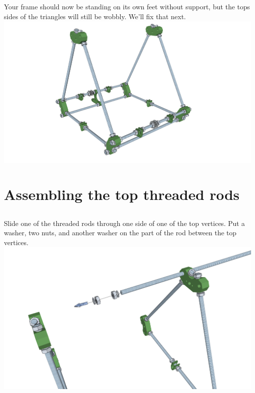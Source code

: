 \documentclass[twoside,a4paper,titlepage]{memoir}
\begin{document}
	\section{}
	Your frame should now be standing on its own feet without support, but the tops sides of the triangles
	will still be wobbly. We'll fix that next.\\
	\includegraphics[width=1\linewidth]{graphics/ch3_5.png}
	
	\chapter{Assembling the top threaded rods}
	
	\section{}
	Slide one of the threaded rods through one side of one of the top vertices. Put a washer, two nuts, and
	another washer on the part of the rod between the top vertices.\\
	\includegraphics[width=1\linewidth]{graphics/ch4_1.png}
	
\end{document}
